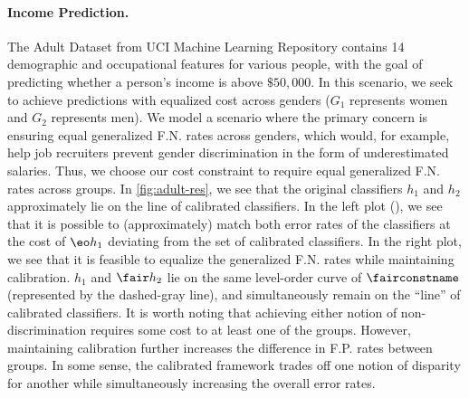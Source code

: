 \paragraph{Income Prediction.}
  The Adult Dataset from UCI Machine Learning Repository \citep{Lichman:2013}
  contains 14 demographic and occupational features for various people, with the
  goal of predicting whether a person's income is above $\$50,000$.
  In this scenario, we seek to achieve predictions with equalized cost
  across genders ($G_1$ represents women and $G_2$ represents men).
  We model a scenario where the primary concern is ensuring
  equal generalized F.N. rates across genders,
  which would, for example, help job recruiters  prevent gender discrimination
  in the form of
  underestimated salaries.
  Thus, we choose our cost constraint to require equal generalized
  F.N. rates across groups.
  In \autoref{fig:adult-res}, we see that the original classifiers $h_1$ and
  $h_2$ approximately
  lie on the line of calibrated classifiers.
  In the left plot (\hardtetal{}), we see that it is possible to
  (approximately) match both error rates of the classifiers at the cost of $\eo
  h_1$ deviating from the set of calibrated classifiers.
  In the right plot,
  we see that it is feasible to
  equalize the generalized F.N. rates while maintaining calibration.
  $h_1$ and $\fair h_2$ lie on the same
  level-order curve of $\fairconstname$ (represented by the dashed-gray line),
  and simultaneously remain on the ``line'' of calibrated classifiers.
  It is worth noting that achieving either notion of non-discrimination requires
  some cost to at least one of the groups.
  However, maintaining calibration further increases the difference
  in F.P. rates between groups. In some sense, the calibrated framework
  trades off one notion of disparity for another while simultaneously increasing the overall error rates.


